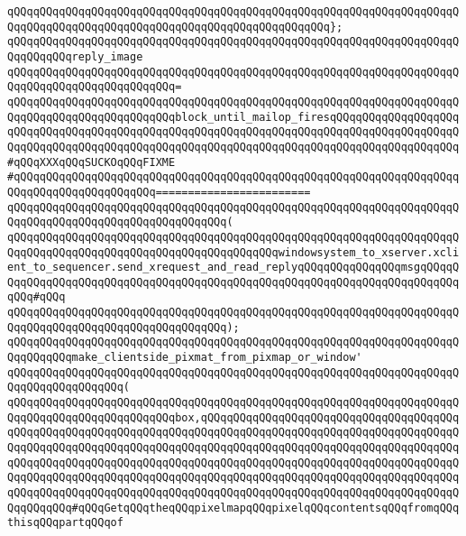 \verb|qQQqqQQqqQQqqQQqqQQqqQQqqQQqqQQqqQQqqQQqqQQqqQQqqQQqqQQqqQQqqQQqqQQqqQQqqQQqqQQqqQQqqQQqqQQqqQQqqQQqqQQqqQQqqQQqqQQqqQQq};|\newline
\newline
\verb|qQQqqQQqqQQqqQQqqQQqqQQqqQQqqQQqqQQqqQQqqQQqqQQqqQQqqQQqqQQqqQQqqQQqqQQqqQQqqQQqreply_image|\newline
\verb|qQQqqQQqqQQqqQQqqQQqqQQqqQQqqQQqqQQqqQQqqQQqqQQqqQQqqQQqqQQqqQQqqQQqqQQqqQQqqQQqqQQqqQQqqQQqqQQq=|\newline
\verb|qQQqqQQqqQQqqQQqqQQqqQQqqQQqqQQqqQQqqQQqqQQqqQQqqQQqqQQqqQQqqQQqqQQqqQQqqQQqqQQqqQQqqQQqqQQqqQQqblock_until_mailop_firesqQQqqQQqqQQqqQQqqQQqqQQqqQQqqQQqqQQqqQQqqQQqqQQqqQQqqQQqqQQqqQQqqQQqqQQqqQQqqQQqqQQqqQQqqQQqqQQqqQQqqQQqqQQqqQQqqQQqqQQqqQQqqQQqqQQqqQQqqQQqqQQqqQQqqQQqqQQqqQQq#qQQqXXXqQQqSUCKOqQQqFIXME|\newline
\verb|#qQQqqQQqqQQqqQQqqQQqqQQqqQQqqQQqqQQqqQQqqQQqqQQqqQQqqQQqqQQqqQQqqQQqqQQqqQQqqQQqqQQqqQQqqQQq========================|\newline
\verb|qQQqqQQqqQQqqQQqqQQqqQQqqQQqqQQqqQQqqQQqqQQqqQQqqQQqqQQqqQQqqQQqqQQqqQQqqQQqqQQqqQQqqQQqqQQqqQQqqQQqqQQq(|\newline
\verb|qQQqqQQqqQQqqQQqqQQqqQQqqQQqqQQqqQQqqQQqqQQqqQQqqQQqqQQqqQQqqQQqqQQqqQQqqQQqqQQqqQQqqQQqqQQqqQQqqQQqqQQqqQQqqQQqwindowsystem_to_xserver.xclient_to_sequencer.send_xrequest_and_read_replyqQQqqQQqqQQqqQQqmsgqQQqqQQqqQQqqQQqqQQqqQQqqQQqqQQqqQQqqQQqqQQqqQQqqQQqqQQqqQQqqQQqqQQqqQQqqQQqqQQq#qQQq|\newline
\verb|qQQqqQQqqQQqqQQqqQQqqQQqqQQqqQQqqQQqqQQqqQQqqQQqqQQqqQQqqQQqqQQqqQQqqQQqqQQqqQQqqQQqqQQqqQQqqQQqqQQqqQQq);|\newline
\newline
\verb|qQQqqQQqqQQqqQQqqQQqqQQqqQQqqQQqqQQqqQQqqQQqqQQqqQQqqQQqqQQqqQQqqQQqqQQqqQQqqQQqmake_clientside_pixmat_from_pixmap_or_window'|\newline
\verb|qQQqqQQqqQQqqQQqqQQqqQQqqQQqqQQqqQQqqQQqqQQqqQQqqQQqqQQqqQQqqQQqqQQqqQQqqQQqqQQqqQQqqQQq(|\newline
\verb|qQQqqQQqqQQqqQQqqQQqqQQqqQQqqQQqqQQqqQQqqQQqqQQqqQQqqQQqqQQqqQQqqQQqqQQqqQQqqQQqqQQqqQQqqQQqqQQqbox,qQQqqQQqqQQqqQQqqQQqqQQqqQQqqQQqqQQqqQQqqQQqqQQqqQQqqQQqqQQqqQQqqQQqqQQqqQQqqQQqqQQqqQQqqQQqqQQqqQQqqQQqqQQqqQQqqQQqqQQqqQQqqQQqqQQqqQQqqQQqqQQqqQQqqQQqqQQqqQQqqQQqqQQqqQQqqQQqqQQqqQQqqQQqqQQqqQQqqQQqqQQqqQQqqQQqqQQqqQQqqQQqqQQqqQQqqQQqqQQqqQQqqQQqqQQqqQQqqQQqqQQqqQQqqQQqqQQqqQQqqQQqqQQqqQQqqQQqqQQqqQQqqQQqqQQqqQQqqQQqqQQqqQQqqQQqqQQqqQQqqQQqqQQqqQQqqQQqqQQqqQQqqQQqqQQqqQQqqQQqqQQqqQQqqQQqqQQqqQQq#qQQqGetqQQqtheqQQqpixelmapqQQqpixelqQQqcontentsqQQqfromqQQqthisqQQqpartqQQqof|\newline

